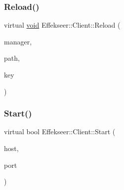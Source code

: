 \mbox{\label{class_effekseer_1_1_client_a82cb4bc702a7cb270dd141fec9f62812}} 
\subsubsection{\texorpdfstring{Reload()}{Reload()}\hspace{0.1cm}{\footnotesize\ttfamily [2/2]}}
{\footnotesize\ttfamily virtual \mbox{\hyperlink{namespace_effekseer_ab34c4088e512200cf4c2716f168deb56}{void}} Effekseer\+::\+Client\+::\+Reload (\begin{DoxyParamCaption}\item[{\mbox{\hyperlink{class_effekseer_1_1_manager}{Manager}} $\ast$}]{manager,  }\item[{const \mbox{\hyperlink{_effekseer_8h_a50b026abea014b47854bcd835b3b6233}{E\+F\+K\+\_\+\+C\+H\+AR}} $\ast$}]{path,  }\item[{const \mbox{\hyperlink{_effekseer_8h_a50b026abea014b47854bcd835b3b6233}{E\+F\+K\+\_\+\+C\+H\+AR}} $\ast$}]{key }\end{DoxyParamCaption})\hspace{0.3cm}{\ttfamily [pure virtual]}}

\mbox{\label{class_effekseer_1_1_client_a8ccf03136f886a34baeabcfd6d3e5cb4}} 
\subsubsection{\texorpdfstring{Start()}{Start()}}
{\footnotesize\ttfamily virtual bool Effekseer\+::\+Client\+::\+Start (\begin{DoxyParamCaption}\item[{char $\ast$}]{host,  }\item[{uint16\+\_\+t}]{port }\end{DoxyParamCaption})\hspace{0.3cm}{\ttfamily [pure virtual]}}

\mbox{\label{class_effekseer_1_1_client_aa490dfe72eeb567e6eff19d9e8b850c1}} 
